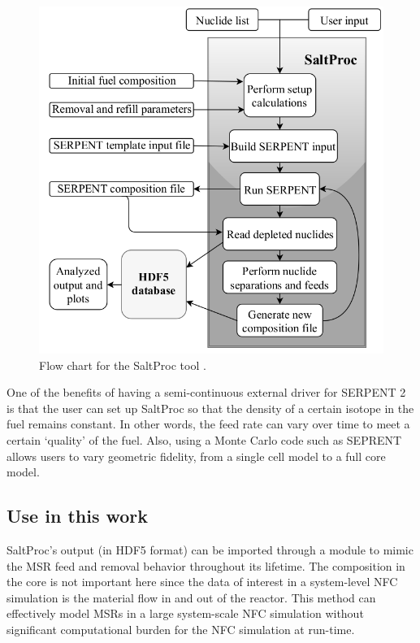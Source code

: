 \begin{figure}[htbp!]
	\begin{center}
		\includegraphics[scale=0.5]{./images/saltproc.png}
	\end{center}
	\caption{Flow chart for the SaltProc tool
		\cite{rykhlevskii_online_2017}.}
	\label{fig:SaltProc}
\end{figure}


One of the benefits of having a semi-continuous external driver for
SERPENT 2 is that the user can set up SaltProc so that the density
of a certain isotope in the fuel remains constant. In other words,
the feed rate can vary over time to meet a certain `quality' of the fuel.
Also, using a Monte Carlo code such as SEPRENT allows users to vary
geometric fidelity, from a single cell model to a full core model.

\subsection{Use in this work}
SaltProc's output (in HDF5 \cite{the_hdf_group_hierarchical_1997} format) can be imported through a \Cyclus
module to mimic the \gls{MSR} feed and removal
behavior throughout its lifetime. The composition in the core is
not important here since the data of interest in a system-level \gls{NFC} simulation
is the material flow in and out of the reactor. This method can
effectively model \glspl{MSR} in a large system-scale \gls{NFC}
simulation without significant computational burden for the \gls{NFC} simulation at run-time.
